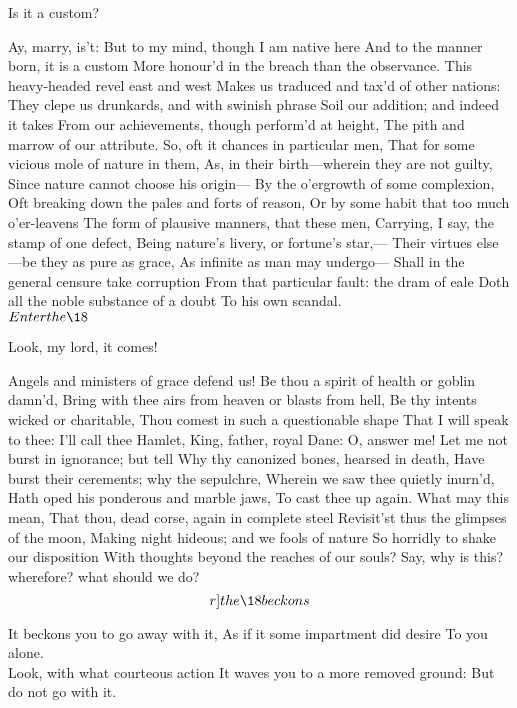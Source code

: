 \documentclass[11pt]{book}
\begin{document}
\6	Is it a custom?

\1	Ay, marry, is't:
	But to my mind, though I am native here
	And to the manner born, it is a custom
	More honour'd in the breach than the observance.
	This heavy-headed revel east and west
	Makes us traduced and tax'd of other nations:
	They clepe us drunkards, and with swinish phrase
	Soil our addition; and indeed it takes
	From our achievements, though perform'd at height,
	The pith and marrow of our attribute.
	So, oft it chances in particular men,
	That for some vicious mole of nature in them,
	As, in their birth---wherein they are not guilty,
	Since nature cannot choose his origin---
	By the o'ergrowth of some complexion,
	Oft breaking down the pales and forts of reason,
	Or by some habit that too much o'er-leavens
	The form of plausive manners, that these men,
	Carrying, I say, the stamp of one defect,
	Being nature's livery, or fortune's star,---
	Their virtues else---be they as pure as grace,
	As infinite as man may undergo---
	Shall in the general censure take corruption
	From that particular fault: the dram of eale
	Doth all the noble substance of a doubt
	To his own scandal. \\

	\(Enter the \18\)

\6	Look, my lord, it comes!

\1	Angels and ministers of grace defend us!
	Be thou a spirit of health or goblin damn'd,
	Bring with thee airs from heaven or blasts from hell,
	Be thy intents wicked or charitable,
	Thou comest in such a questionable shape
	That I will speak to thee: I'll call thee Hamlet,
	King, father, royal Dane: O, answer me!
	Let me not burst in ignorance; but tell
	Why thy canonized bones, hearsed in death,
	Have burst their cerements; why the sepulchre,
	Wherein we saw thee quietly inurn'd,
	Hath oped his ponderous and marble jaws,
	To cast thee up again. What may this mean,
	That thou, dead corse, again in complete steel
	Revisit'st thus the glimpses of the moon,
	Making night hideous; and we fools of nature
	So horridly to shake our disposition
	With thoughts beyond the reaches of our souls?
	Say, why is this? wherefore? what should we do?
	\[r]the \18 beckons\]

\6	It beckons you to go away with it,
	As if it some impartment did desire
	To you alone. \\

	                  Look, with what courteous action
	It waves you to a more removed ground:
	But do not go with it. \\
\end{document}
